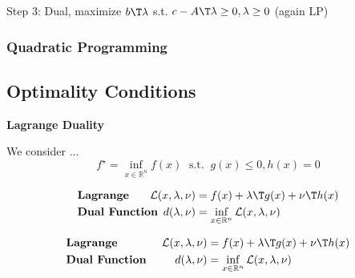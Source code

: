 Step 3: Dual,
maximize $b\T\lambda$
s.t.
$c-A\T\lambda\ge0,\lambda\ge0$
(again LP)

\subsubsection{Quadratic Programming}

\subsection{Optimality Conditions}

\begin{sstTitleBox}{\textbf{\large
			Lagrange Duality
		}}
	\begin{centering}
		We consider ...
		\small
		\begin{equation}
			f^\star = \inf_{x\in\mathcal{\mathbb{R}}^n}f(x)
			\;\text{ s.t. }\ g(x)\le0,h(x)=0
			\label{eq:dual}
		\end{equation}

		\begin{sstFrame}
			{\color{white}
				\vspace{-3mm}
				\[\begin{aligned}
						 & \textbf{Lagrange}      & \hspace{-6mm}	\mathcal{L}(x,\lambda,\nu) & = f(x) + \lambda\T g(x)+\nu\T h(x)
						\\
						 & \textbf{Dual Function} & \hspace{-6mm}		d(\lambda,\nu)            & = \inf_{x \in \mathcal{\mathbb{R}}^n}\mathcal{L}(x,\lambda,\nu)
					\end{aligned}\]
				\vspace{-4mm}
			}
		\end{sstFrame}
	\end{centering}
\end{sstTitleBox}

$$\begin{aligned}
		                           & \textbf{Lagrange }                                              &
		\mathcal{L}(x,\lambda,\nu) & = f(x) + \lambda\T g(x)+\nu\T h(x)
		\\
		                           & \textbf{Dual Function }                                         &
		d(\lambda,\nu)             & = \inf_{x \in \mathcal{\mathbb{R}}^n}\mathcal{L}(x,\lambda,\nu)
	\end{aligned}$$

